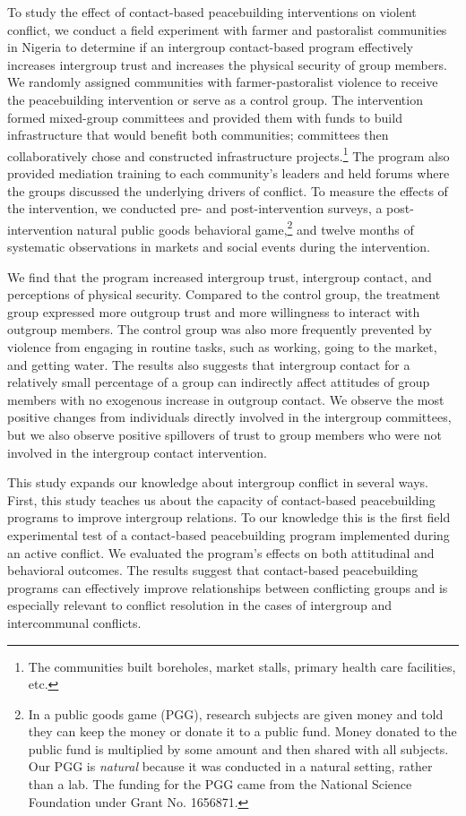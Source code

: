\documentclass[11pt]{article}
\begin{document}
To study the effect of contact-based peacebuilding interventions on
violent conflict, we conduct a field experiment with farmer and
pastoralist communities in Nigeria to determine if an intergroup
contact-based program effectively increases intergroup trust and
increases the physical security of group members. We randomly assigned
communities with farmer-pastoralist violence to receive the
peacebuilding intervention or serve as a control group. The intervention
formed mixed-group committees and provided them with funds to build
infrastructure that would benefit both communities; committees then
collaboratively chose and constructed infrastructure projects.\footnote{The
  communities built boreholes, market stalls, primary health care
  facilities, etc.} The program also provided mediation training to each
community's leaders and held forums where the groups discussed the
underlying drivers of conflict. To measure the effects of the
intervention, we conducted pre- and post-intervention surveys, a
post-intervention natural public goods behavioral game,\footnote{In a
  public goods game (PGG), research subjects are given money and told
  they can keep the money or donate it to a public fund. Money donated
  to the public fund is multiplied by some amount and then shared with
  all subjects. Our PGG is \emph{natural} because it was conducted in a
  natural setting, rather than a lab. The funding for the PGG came from
  the National Science Foundation under Grant No. 1656871.} and twelve
months of systematic observations in markets and social events during
the intervention.

We find that the program increased intergroup trust, intergroup contact,
and perceptions of physical security. Compared to the control group, the
treatment group expressed more outgroup trust and more willingness to
interact with outgroup members. The control group was also more
frequently prevented by violence from engaging in routine tasks, such as
working, going to the market, and getting water. The results also
suggests that intergroup contact for a relatively small percentage of a
group can indirectly affect attitudes of group members with no exogenous
increase in outgroup contact. We observe the most positive changes from
individuals directly involved in the intergroup committees, but we also
observe positive spillovers of trust to group members who were not
involved in the intergroup contact intervention.

This study expands our knowledge about intergroup conflict in several
ways. First, this study teaches us about the capacity of contact-based
peacebuilding programs to improve intergroup relations. To our knowledge
this is the first field experimental test of a contact-based
peacebuilding program implemented during an active conflict. We
evaluated the program's effects on both attitudinal and behavioral
outcomes. The results suggest that contact-based peacebuilding programs
can effectively improve relationships between conflicting groups and is
especially relevant to conflict resolution in the cases of intergroup
and intercommunal conflicts.
\end{document}
